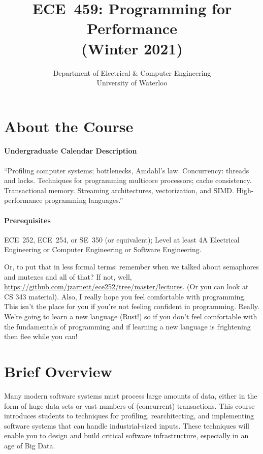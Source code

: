 \documentclass[letterpaper,10pt]{article}
\date{}
\let\LaTeXtitle\title
\renewcommand{\title}[1]{\LaTeXtitle{\textsf{#1}}}
\begin{document}
\title{\bf\LARGE ECE~459: Programming for Performance\\ (Winter 2021)}
\author{Department of Electrical \& Computer Engineering \\
                University of Waterloo}
\renewcommand{\today}{}
\maketitle
\vspace*{-2em}

\section*{About the Course}

\paragraph{Undergraduate Calendar Description} ``Profiling computer systems; bottlenecks, Amdahl's law. Concurrency: threads and locks. Techniques for programming multicore processors; cache consistency. Transactional memory. Streaming architectures, vectorization, and SIMD. High-performance programming languages.''

\paragraph{Prerequisites} ECE~252, ECE~254, or SE~350 (or equivalent); Level at least 4A Electrical Engineering or Computer Engineering or Software Engineering.

Or, to put that in less formal terms: remember when we talked about semaphores and mutexes and all of that? If not, well, \url{https://github.com/jzarnett/ece252/tree/master/lectures}. (Or you can look at CS 343 material). Also, I really hope you feel comfortable with programming. This isn't the place for you if you're not feeling confident in programming. Really. We're going to learn a new language (Rust!) so if you don't feel comfortable with the fundamentals of programming and if learning a new language is frightening then flee while you can!

\section*{Brief Overview}

Many modern software systems must process large amounts of data, either in the
form of huge data sets or vast numbers of (concurrent) transactions.  This
course introduces students to techniques for profiling, rearchitecting, and
implementing software systems that can handle industrial-sized
inputs. These techniques will enable you to design and build
critical software infrastructure, especially in an age of Big Data.
\end{document}
